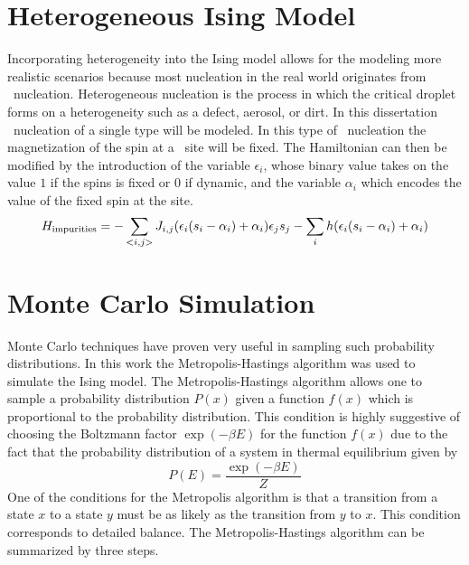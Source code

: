 \section{Heterogeneous Ising Model}
Incorporating heterogeneity into the Ising model allows for the modeling more realistic scenarios because most nucleation in the real world originates from \het\ nucleation. 
Heterogeneous nucleation is the process in which the critical droplet forms on a heterogeneity such as a defect, aerosol, or dirt. In this dissertation \het\ nucleation of a single type will be modeled. In this type of \het\ nucleation the magnetization of the spin at a \het\ site will be fixed. The Hamiltonian can then be modified by the introduction of the variable $\epsilon_i$, whose binary value takes on the value $1$ if the spins is fixed or $0$ if dynamic, and the variable $\alpha_i$ which encodes the value of the fixed spin  at the site.%
\begin{equation}
\label{eq:heter_ising}
H_{\rm impurities} = -\sum\limits_{{<}i,j{>}} J_{i,j} (\epsilon_i (s_i-\alpha_i)+\alpha_i) \epsilon_j s_j -\sum\limits_{i} h (\epsilon_i (s_i-\alpha_i)+\alpha_i) 
\end{equation}%
\section{Monte Carlo Simulation}
Monte Carlo techniques have proven very useful in sampling such probability distributions. In this work the Metropolis-Hastings algorithm was used to simulate the Ising model.
The Metropolis-Hastings algorithm allows one to sample a probability distribution $P(x)$ given a function $f(x)$ which is proportional to the probability distribution. This condition is highly suggestive of choosing the Boltzmann factor $\exp{(-\beta E)}$ for the function $f(x)$ due to the fact that the probability distribution of a system in thermal equilibrium given by
\begin{equation}
	\label{eq:boltz}
P(E)  = \frac{ \exp{(-\beta E)} }{Z}
\end{equation}%
One of the conditions for the Metropolis algorithm is that a transition from a state $x$ to a state $y$ must be as likely as the transition from $y$ to $x$. This condition corresponds to  detailed balance. The Metropolis-Hastings algorithm can be summarized by three steps.


